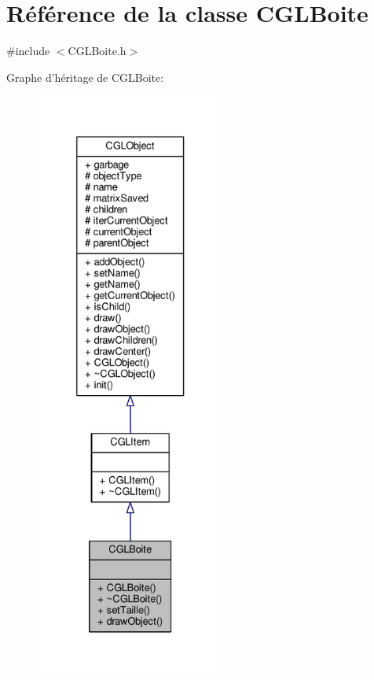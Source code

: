 \hypertarget{class_c_g_l_boite}{\section{Référence de la classe C\-G\-L\-Boite}
\label{class_c_g_l_boite}
}


{\ttfamily \#include $<$C\-G\-L\-Boite.\-h$>$}



Graphe d'héritage de C\-G\-L\-Boite\-:\nopagebreak
\begin{figure}[H]
\begin{center}
\leavevmode
\includegraphics[height=550pt]{d2/d90/class_c_g_l_boite__inherit__graph}
\end{center}
\end{figure}


